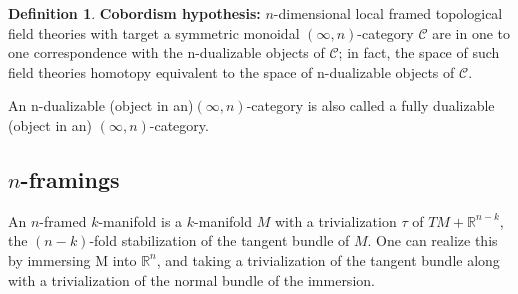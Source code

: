 \documentclass[12pt,a4paper,draft]{article}
\theoremstyle{remark}
\theoremstyle{definition}
\newtheorem{Def}[theorem]{Definition}
\numberwithin{equation}{section}
\newcommand\RR{\mathbb R}
\newcommand \C{\mathcal C}
\begin{document}
\begin{Def}
\textbf{Cobordism hypothesis:} $n$-dimensional local framed topological field theories with target a symmetric monoidal $(\infty, n)$-category $\C$ are in one to one correspondence with the n-dualizable objects of $\C$; in fact, the space of such field theories homotopy equivalent to the space of n-dualizable objects of $\C$.
\end{Def}
An n-dualizable (object in an)$(\infty, n)$-category is also called a fully dualizable (object in an) $(\infty, n)$-category.

\subsection{$n$-framings}

An $n$-framed $k$-manifold is a $k$-manifold $M$ with a trivialization $\tau$ of $TM +\RR^{n-k}$, the $(n-k)$-fold stabilization of the tangent bundle of $M$. One can realize this by immersing M into $\RR^n$, and taking a trivialization of the tangent bundle along with a trivialization of the normal bundle of the immersion.
\end{document}
